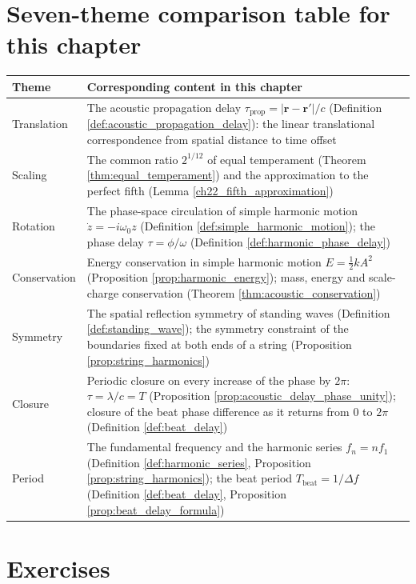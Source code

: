 \section*{Seven-theme comparison table for this chapter}

\begin{center}
\begin{tabular}{>{\centering\arraybackslash}p{2.8cm}>{\centering\arraybackslash}p{9.9cm}}
\toprule
Theme & Corresponding content in this chapter \\
\midrule
Translation & The acoustic propagation delay $\tau_{\text{prop}} = |\mathbf{r}-\mathbf{r}'|/c$ (Definition \ref{def:acoustic_propagation_delay}): the linear translational correspondence from spatial distance to time offset \\
Scaling & The common ratio $2^{1/12}$ of equal temperament (Theorem \ref{thm:equal_temperament}) and the approximation to the perfect fifth (Lemma \ref{ch22_fifth_approximation}) \\
Rotation & The phase-space circulation of simple harmonic motion $\dot z = -i\omega_0 z$ (Definition \ref{def:simple_harmonic_motion}); the phase delay $\tau = \phi/\omega$ (Definition \ref{def:harmonic_phase_delay}) \\
Conservation & Energy conservation in simple harmonic motion $E = \frac{1}{2}kA^2$ (Proposition \ref{prop:harmonic_energy}); mass, energy and scale-charge conservation (Theorem \ref{thm:acoustic_conservation}) \\
Symmetry & The spatial reflection symmetry of standing waves (Definition \ref{def:standing_wave}); the symmetry constraint of the boundaries fixed at both ends of a string (Proposition \ref{prop:string_harmonics}) \\
Closure & Periodic closure on every increase of the phase by $2\pi$: $\tau = \lambda/c = T$ (Proposition \ref{prop:acoustic_delay_phase_unity}); closure of the beat phase difference as it returns from $0$ to $2\pi$ (Definition \ref{def:beat_delay}) \\
Period & The fundamental frequency and the harmonic series $f_n = n f_1$ (Definition \ref{def:harmonic_series}, Proposition \ref{prop:string_harmonics}); the beat period $T_{\text{beat}} = 1/\Delta f$ (Definition \ref{def:beat_delay}, Proposition \ref{prop:beat_delay_formula}) \\
\bottomrule
\end{tabular}
\end{center}

\section*{Exercises}

